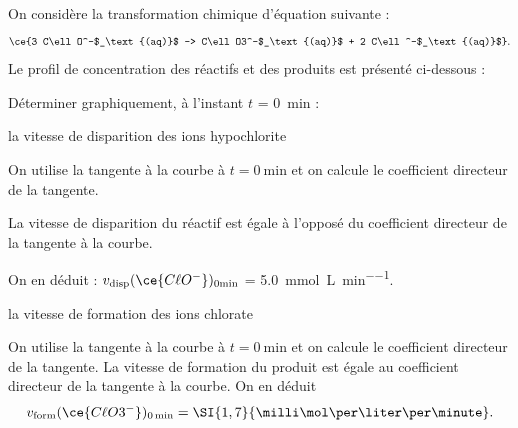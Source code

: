 On considère la transformation chimique d'équation suivante : 
\[
\ce{3 C\ell O^-$_\text{(aq)}$ -> C\ell O3^-$_\text{(aq)}$ + 2 C\ell^-$_\text{(aq)}$}.\]
Le profil de concentration des réactifs et des produits est présenté ci-dessous :

\begin{center}

\end{center}

\debutEntrainement

Déterminer graphiquement, à l’instant $t$ = \SI{0}{\minute} : 


\begin{enonce}
la vitesse de disparition des ions hypochlorite 
\end{enonce}



\begin{corrige}
On utilise la tangente à la courbe à $t=\SI{0}{\minute}$ et on calcule le coefficient directeur de la tangente. 

La vitesse de disparition du réactif est égale à l'opposé du coefficient directeur de la tangente à la courbe. 

On en déduit :
$v_\text{disp}(\ce{C\ell O^-})_\text{0min}$ = \SI{5,0}{\milli\mol\per\liter\per\minute}. 
\end{corrige}


\begin{enonce}
la vitesse de formation des ions chlorate 
\end{enonce}


\begin{corrige}
On utilise la tangente à la courbe à $t=\SI{0}{\minute}$ et on calcule le coefficient directeur de la tangente. La vitesse de formation du produit est égale au coefficient directeur de la tangente à la courbe. On en déduit 
\[
v_\text{form}(\ce{C\ell O3^-})_\text{0\,min} = \SI{1,7}{\milli\mol\per\liter\per\minute}.
\]
\end{corrige}

